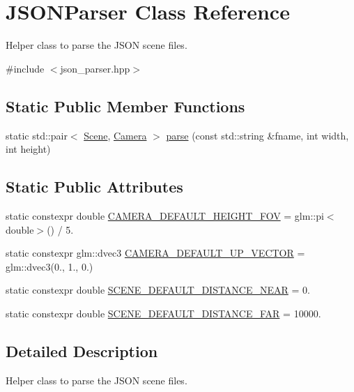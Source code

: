 \hypertarget{class_j_s_o_n_parser}{}\section{J\+S\+O\+N\+Parser Class Reference}
\label{class_j_s_o_n_parser}


Helper class to parse the J\+S\+ON scene files.  




{\ttfamily \#include $<$json\+\_\+parser.\+hpp$>$}

\subsection*{Static Public Member Functions}
\begin{DoxyCompactItemize}
\item 
static std\+::pair$<$ \hyperlink{class_scene}{Scene}, \hyperlink{class_camera}{Camera} $>$ \hyperlink{class_j_s_o_n_parser_a0c127858348c36af0ac74a9653eaf6a0}{parse} (const std\+::string \&fname, int width, int height)
\end{DoxyCompactItemize}
\subsection*{Static Public Attributes}
\begin{DoxyCompactItemize}
\item 
static constexpr double \hyperlink{class_j_s_o_n_parser_a22e4a2b46ab4556ab6be042932ac60dc}{C\+A\+M\+E\+R\+A\+\_\+\+D\+E\+F\+A\+U\+L\+T\+\_\+\+H\+E\+I\+G\+H\+T\+\_\+\+F\+OV} = glm\+::pi$<$double$>$() / 5.
\item 
static constexpr glm\+::dvec3 \hyperlink{class_j_s_o_n_parser_a2deb13759a25487b8033aaf84ac7c561}{C\+A\+M\+E\+R\+A\+\_\+\+D\+E\+F\+A\+U\+L\+T\+\_\+\+U\+P\+\_\+\+V\+E\+C\+T\+OR} = glm\+::dvec3(0., 1., 0.)
\item 
static constexpr double \hyperlink{class_j_s_o_n_parser_a319445abcd1d1aebf5016488df6184ac}{S\+C\+E\+N\+E\+\_\+\+D\+E\+F\+A\+U\+L\+T\+\_\+\+D\+I\+S\+T\+A\+N\+C\+E\+\_\+\+N\+E\+AR} = 0.
\item 
static constexpr double \hyperlink{class_j_s_o_n_parser_adcd06251c7b4b7ae8386d62dd4e72e07}{S\+C\+E\+N\+E\+\_\+\+D\+E\+F\+A\+U\+L\+T\+\_\+\+D\+I\+S\+T\+A\+N\+C\+E\+\_\+\+F\+AR} = 10000.
\end{DoxyCompactItemize}


\subsection{Detailed Description}
Helper class to parse the J\+S\+ON scene files. 

